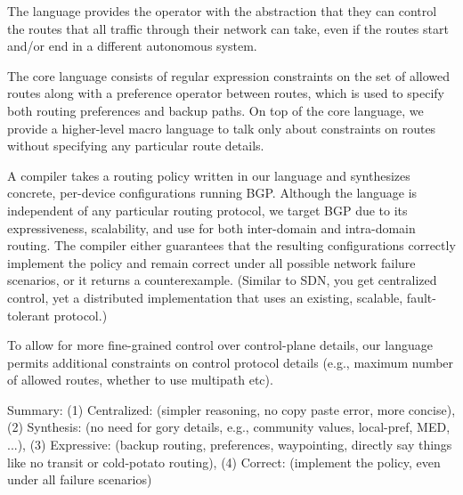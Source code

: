 The language provides the operator with the abstraction that they can control the routes that all traffic through their network can take, even if the routes start and/or end in a different autonomous system.

The core language consists of regular expression constraints on the set of allowed routes along with a preference operator between routes, which is used to specify both routing preferences and backup paths.
On top of the core language, we provide a higher-level macro language to talk only about constraints on routes without specifying any particular route details.
	
A compiler takes a routing policy written in our language and synthesizes concrete, per-device configurations running BGP. Although the language is independent of any particular routing protocol, we target BGP due to its expressiveness, scalability, and use for both inter-domain and intra-domain routing.
The compiler either guarantees that the resulting configurations correctly implement the policy and remain correct under all possible network failure scenarios, or it returns a counterexample.
(Similar to SDN, you get centralized control, yet a distributed implementation that uses an existing, scalable, fault-tolerant protocol.)

To allow for more fine-grained control over control-plane details, our language permits additional constraints on control protocol details (e.g., maximum number of allowed routes, whether to use multipath etc).


Summary:
	 (1) Centralized: (simpler reasoning, no copy paste error, more concise),
	 (2) Synthesis: (no need for gory details, e.g., community values, local-pref, MED, ...),
	 (3) Expressive: (backup routing, preferences, waypointing, directly say things like no transit or cold-potato routing),
	 (4) Correct: (implement the policy, even under all failure scenarios)


